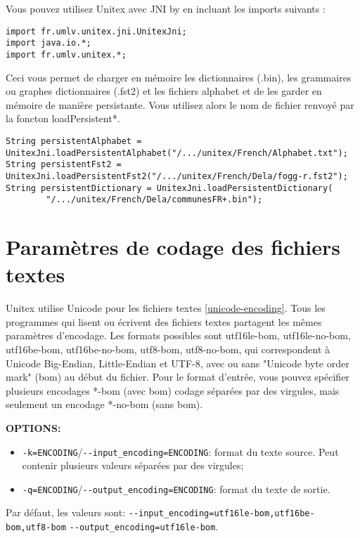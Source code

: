 Vous pouvez utilisez Unitex avec JNI by en incluant les imports suivants : 
\begin{verbatim}
import fr.umlv.unitex.jni.UnitexJni;
import java.io.*;
import fr.umlv.unitex.*;
\end{verbatim}
Ceci vous permet de charger en mémoire les dictionnaires (.bin), les grammaires ou graphes dictionnaires (.fst2) et les fichiers alphabet et de les garder en mémoire de manière persistante. Vous utilisez alors le nom de fichier renvoyé par la foncton loadPersistent*.

\begin{verbatim}
String persistentAlphabet = UnitexJni.loadPersistentAlphabet("/.../unitex/French/Alphabet.txt");
String persistentFst2 = UnitexJni.loadPersistentFst2("/.../unitex/French/Dela/fogg-r.fst2");
String persistentDictionary = UnitexJni.loadPersistentDictionary(
		"/.../unitex/French/Dela/communesFR+.bin");
\end{verbatim}


\section{Paramètres de codage des fichiers textes}
\label{section-text-file-encoding-parameters}
Unitex utilise Unicode pour les fichiers textes \ref{unicode-encoding}. Tous les programmes qui
lisent ou écrivent des fichiers textes partagent les mêmes paramètres d'encodage. Les formats
possibles sont utf16le-bom, utf16le-no-bom, utf16be-bom, utf16be-no-bom, utf8-bom, utf8-no-bom, qui
correspondent à Unicode Big-Endian, Little-Endian et UTF-8, avec ou sans "Unicode byte order mark"
(bom) au début du fichier. Pour le format d'entrée, vous pouvez spécifier plusieurs encodages *-bom
(avec bom) codage séparées par des virgules, mais seulement un encodage *-no-bom (sans bom).

\bigskip
\noindent \textbf{OPTIONS:}
\begin{itemize}
\item \verb+-k=ENCODING+/\verb+--input_encoding=ENCODING+: format du texte source. Peut contenir
plusieurs valeurs séparées par des virgules;
\item \verb+-q=ENCODING+/\verb+--output_encoding=ENCODING+: format du texte de sortie. 
\end{itemize}

\noindent Par défaut, les valeurs sont: \verb+--input_encoding=utf16le-bom,utf16be-bom,utf8-bom+
\newline \verb+--output_encoding=utf16le-bom+.


